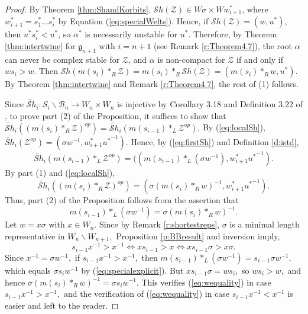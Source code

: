 \documentclass[12pt]{amsart}
\numberwithin{equation}{section}
\newcommand{\cZ}{{\mathcal Z}}
\newcommand{\Wn}{{W}_n}
\newcommand{\cW}{{ W}}
\newcommand{\fg}{\mbox{${\mathfrak g}$}}
\newcommand{\B}{\mathcal{B}}
\newcommand{\Sh}{\mathcal{S}h}
\begin{document}
 \begin{proof}
 By Theorem \ref{thm:ShandKorbits}, $\Sh(\cZ)\in W\sigma\times W w_{i+1}^{*}$, where $w_{i+1}^{*}=s_{1}^{*}\dots s_{i}^{*}$ by Equation (\ref{eq:specialWelts}).  Hence, if $\Sh(\cZ)=(w,u^{*})$, then $u^{*}s_{i}^{*}<u^{*}$, so 
 $\alpha^{*}$ is necessarily unstable for $u^{*}$.  Therefore, by Theorem \ref{thm:intertwine} for $\fg_{n+1}$ with $i=n+1$ (see Remark \ref{r:Theorem4.7}), the root $\alpha$ can never be complex stable for $\cZ$, and $\alpha$ is non-compact for $\cZ$ if and only if $ws_{i}>w$.  Then $\Sh(m(s_{i})*_{R} \cZ)=m(s_{i})*_{R} \Sh(\cZ)=(m(s_{i})*_{R} w, u^{*})$.  By Theorem \ref{thm:intertwine} and Remark \ref{r:Theorem4.7}, the rest of (1) follows.  
 
Since $\widetilde{\Sh}_{i}:S_i\backslash\B_n \to W_{n}\times W_{n}$ is injective by Corollary 3.18 and Definition 3.22 of \cite{Siorbits}, to prove part (2) of the Proposition, it suffices to show that $\widetilde{\Sh}_{i}((m(s_{i})*_{R}\cZ)^{op})=\widetilde{\Sh}_{i}(m(s_{i-1})*_{L}\cZ^{op}).$   By (\ref{eq:localSh}), $\widetilde{Sh}_{i}({\cZ}^{op})=(\sigma w^{-1}, w_{i+1}^{*} {u^{*}}^{-1}).$   Hence, by (\ref{eq:firstSh}) and Definition \ref{d:istd},  
\begin{equation}\label{e:miminusoneside}
\widetilde{Sh}_{i}(m(s_{i-1})*_{L}{\cZ}^{op})=((m(s_{i-1})*_{L}(\sigma w^{-1}), w_{i+1}^{*} {u^{*}}^{-1}).
\end{equation}
By part (1) and (\ref{eq:localSh}),
\begin{equation}\label{e:miside}
\widetilde{\Sh}_{i}((m(s_{i})*_{R}\cZ)^{op})=(\sigma(m(s_i)*_{R} w)^{-1}, w_{i+1}^{*} {u^{*}}^{-1}).
\end{equation}
Thus,  part (2) of the Proposition follows from the assertion that
\begin{equation}\label{eq:wequality}
 m(s_{i-1})*_{L}(\sigma w^{-1})=\sigma(m(s_i)*_{R} w)^{-1}.
\end{equation}
Let $w=x\sigma$ with $x\in W_{n}$.  Since by Remark \ref{r:shortestreps}, $\sigma$ is a minimal length representative in $\Wn \backslash {\cW}_{n+1},$ Proposition \ref{p:BBresult} and inversion imply, $$s_{i-1}x^{-1} > x^{-1}\iff xs_{i-1} > x\iff xs_{i-1}\sigma > x\sigma.$$  Since $x^{-1}=\sigma w^{-1},$ if $s_{i-1}x^{-1} > x^{-1},$ then  $m(s_{i-1})*_{L}(\sigma w^{-1})=s_{i-1}\sigma w^{-1},$ which equals $\sigma s_i w^{-1}$ by (\ref{eq:specialexplicit}).  But $xs_{i-1}\sigma = w s_i,$ so $w s_i > w,$ and hence $\sigma (m(s_i)*_{R} w)^{-1}=\sigma s_i w^{-1}.$  This verifies (\ref{eq:wequality}) in case $s_{i-1} x^{-1} > x^{-1},$ and the verification of (\ref{eq:wequality}) in case $s_{i-1}x^{-1} < x^{-1}$ is easier and left to the reader.
 

\end{proof}
\end{document}
